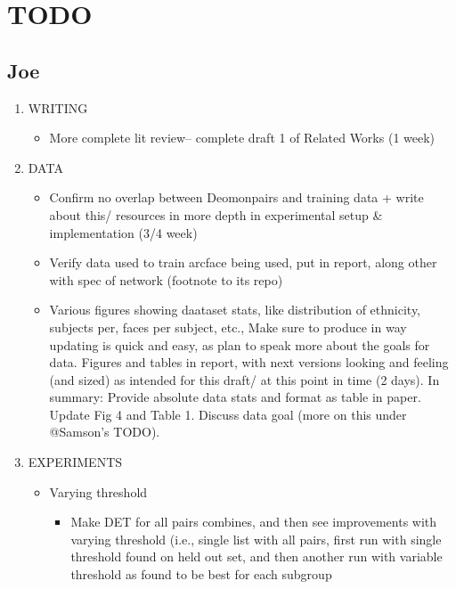\begingroup
\let\clearpage\relax 
\onecolumn 
\newpage
\newpage\newpage



\section*{TODO}
\subsection{Joe}
\begin{enumerate}
    \item  WRITING
    \begin{itemize}
        \item More complete lit review-- complete draft 1 of Related Works (1 week)
    \end{itemize} 
    \item DATA
    \begin{itemize}
        \item Confirm no overlap between Deomonpairs and training data + write about this/ resources in more depth in experimental setup & implementation (3/4 week)
        \item Verify data used to train arcface being used, put in report, along other with spec of network (footnote to its repo)
        \item Various figures showing daataset stats, like distribution of ethnicity, subjects per, faces per subject, etc., Make sure to produce in way updating is quick and easy, as plan to speak more about the goals for data. Figures and tables in report, with next versions looking and feeling (and sized) as intended for this draft/ at this point in time (2 days). In summary: Provide absolute data stats and format as table in paper. Update Fig 4 and Table 1. Discuss data goal (more on this under @Samson's TODO).
    \end{itemize}
    \item EXPERIMENTS
    \begin{itemize}
        \item Varying threshold
        \begin{itemize}
            \item Make DET for all pairs combines, and then see improvements with varying threshold (i.e., single list with all pairs, first run with single threshold found on held out set, and then another run with variable threshold as found to be best for each subgroup
        \end{itemize}

\end{itemize}
\end{enumerate}
